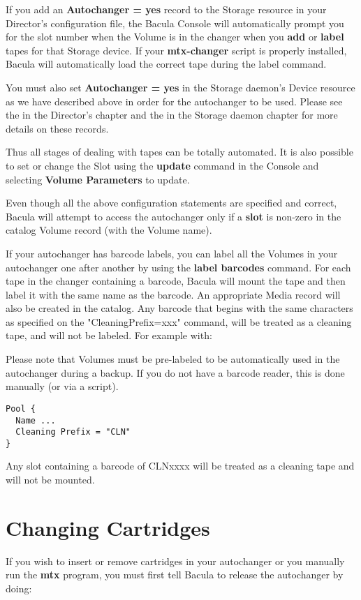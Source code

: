 If you add an {\bf Autochanger = yes} record to the Storage resource in your
Director's configuration file, the Bacula Console will automatically prompt
you for the slot number when the Volume is in the changer when
you {\bf add} or {\bf label} tapes for that Storage device. If your
{\bf mtx-changer} script is properly installed, Bacula will automatically
load the correct tape during the label command.
  
You must also set
{\bf Autochanger = yes} in the Storage daemon's Device resource                
as we have described above in
order for the autochanger to be used. Please see the 
 in the Director's chapter
and the 
 in the Storage daemon
chapter for more details on these records. 

Thus all stages of dealing with tapes can be totally automated. It is also
possible to set or change the Slot using the {\bf update} command in the
Console and selecting {\bf Volume Parameters} to update. 

Even though all the above configuration statements are specified and correct,
Bacula will attempt to access the autochanger only if a {\bf slot} is non-zero
in the catalog Volume record (with the Volume name). 

If your autochanger has barcode labels, you can label all the Volumes in
your autochanger one after another by using the {\bf label barcodes} command.
For each tape in the changer containing a barcode, Bacula will mount the tape
and then label it with the same name as the barcode. An appropriate Media
record will also be created in the catalog. Any barcode that begins with the
same characters as specified on the "CleaningPrefix=xxx" command, will be
treated as a cleaning tape, and will not be labeled. For example with: 

Please note that Volumes must be pre-labeled to be automatically used in
the autochanger during a backup.  If you do not have a barcode reader, this
is done manually (or via a script).

\footnotesize
\begin{verbatim}
Pool {
  Name ...
  Cleaning Prefix = "CLN"
}
\end{verbatim}
\normalsize

Any slot containing a barcode of CLNxxxx will be treated as a cleaning tape
and will not be mounted.

\section{Changing Cartridges}
If you wish to insert or remove cartridges in your autochanger or
you manually run the {\bf mtx} program, you must first tell Bacula
to release the autochanger by doing:


